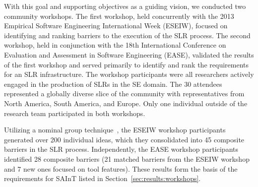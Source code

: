 With this goal and supporting objectives as a guiding vision, we conducted two community workshops.
The first workshop, held concurrently with the 2013 Empirical Software Engineering International Week (ESEIW), focused on identifying and ranking barriers to the execution of the SLR process.  
The second workshop, held in conjunction with the 18th International Conference on Evaluation and Assessment in Software Engineering (EASE), validated the results of the first workshop and served primarily to identify and rank the requirements for an SLR infrastructure.
The workshop participants were all researchers actively engaged in the production of SLRs in the SE domain.  
The 30 attendees represented a globally diverse slice of the community with representatives from North America, South America, and Europe.  
Only one individual outside of the research team participated in both workshops. 

Utilizing a nominal group technique~\cite{Delbecq-etal:75,Lethbridge-etal:00}, the ESEIW workshop participants generated over 200 individual ideas, which they consolidated into 45 composite barriers in the SLR process. 
Independently, the EASE workshop participants identified 28 composite barriers (21 matched barriers from the ESEIW workshop and 7 new ones focused on tool features).
These results form the basis of the requirements for SAInT listed in Section~\ref{sec:results:workshops}.


